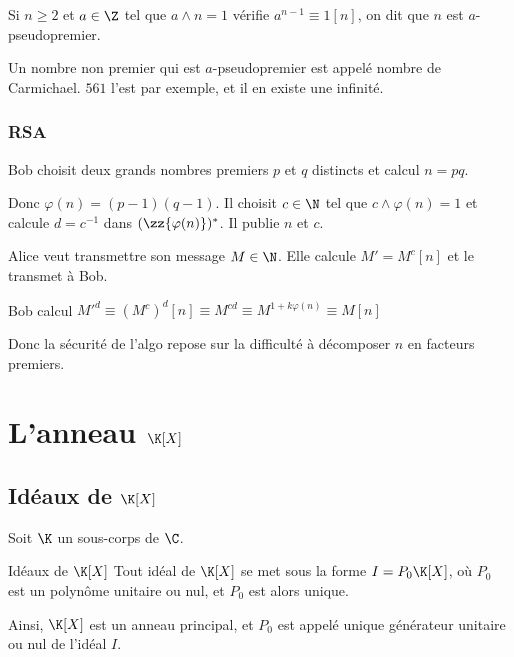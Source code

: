 Si $n \geqslant 2$ et $a \in \Z$ tel que $a \wedge n = 1$ vérifie $a^{n -1} \equiv 1 [n]$,
on dit que $n$ est $a$-pseudopremier.

Un nombre non premier qui est $a$-pseudopremier est appelé nombre de Carmichael. 
$561$ l'est par exemple, et il en existe une infinité. 

\subsubsection{RSA }

Bob choisit deux grands nombres premiers $p$ et $q$ distincts et calcul $n = pq$. 

Donc $\varphi(n) = (p- 1)(q-1)$. Il choisit $c \in \N$ tel que $c \wedge \varphi(n) = 1$ et 
calcule $d = c^{-1}$ dans $(\zz {\varphi(n)})^*$. Il publie $n$ et $c$. 

Alice veut transmettre son message $M \in \N$. Elle calcule $M' = M^c [n]$ et le transmet à Bob.

Bob calcul $M'^d \equiv (M^c)^d [n] \equiv M^{cd} \equiv M^{1 + k \varphi(n)} \equiv M[n]$

Donc la sécurité de l'algo repose sur la difficulté à décomposer $n$ en facteurs premiers. 


\section{L'anneau \texorpdfstring{$\K [X]$}{K[X]}}
\subsection{Idéaux de \texorpdfstring{$\K [X]$}{K[X]}}

Soit $\K$ un sous-corps de $\C$.

\begin{theoreme}{Idéaux de $\K[X]$}{}
    Tout idéal de $\K[X]$ se met sous la forme $I = P_0 \K[X]$, où $P_0$ est un polynôme
    unitaire ou nul, et $P_0$ est alors unique.

    Ainsi, $\K[X]$ est un anneau principal, et $P_0$ est appelé unique générateur unitaire 
    ou nul de l'idéal $I$.
\end{theoreme}


